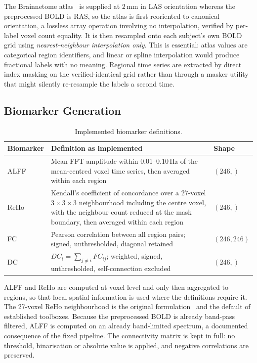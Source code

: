 \documentclass{ssnreview}
\begin{document}
The Brainnetome atlas~\cite{brainnetome} is supplied at 2\,mm in LAS orientation
whereas the
preprocessed BOLD is RAS, so the atlas is first reoriented to canonical orientation,
a lossless array operation involving no interpolation, verified by per-label voxel
count equality. It is then resampled onto each subject's own BOLD grid using
\emph{nearest-neighbour interpolation only}. This is essential: atlas values are
categorical region identifiers, and linear or spline interpolation would produce
fractional labels with no meaning. Regional time series are extracted by direct index
masking on the verified-identical grid rather than through a masker utility that
might silently re-resample the labels a second time.

\subsection{Biomarker Generation}

\begin{table}[!htbp]
\centering
\caption{Implemented biomarker definitions.}
\label{tab:biomarkers}
\small
\begin{tabularx}{\textwidth}{@{}l>{\raggedright\arraybackslash}Xl@{}}
\toprule
\textbf{Biomarker} & \textbf{Definition as implemented} & \textbf{Shape} \\
\midrule
ALFF & Mean FFT amplitude within 0.01--0.10\,Hz of the mean-centred voxel time
series, then averaged within each region & $(246,)$ \\
ReHo & Kendall's coefficient of concordance over a 27-voxel $3\times3\times3$
neighbourhood including the centre voxel, with the neighbour count reduced at the
mask boundary, then averaged within each region & $(246,)$ \\
FC & Pearson correlation between all region pairs; signed, unthresholded, diagonal
retained & $(246,246)$ \\
DC & $DC_i = \sum_{j \neq i} FC_{ij}$; weighted, signed, unthresholded,
self-connection excluded & $(246,)$ \\
\bottomrule
\end{tabularx}
\end{table}

ALFF and ReHo are computed at voxel level and only then aggregated to regions, so that local
spatial information is used where the definitions require it. The 27-voxel ReHo
neighbourhood is the original formulation~\cite{reho} and the default of established
toolboxes. Because the preprocessed BOLD is already band-pass filtered, ALFF is computed on
an already band-limited spectrum, a documented consequence of the fixed pipeline. The
connectivity matrix is kept in full: no threshold, binarisation or absolute value is
applied, and negative correlations are preserved.
\end{document}
